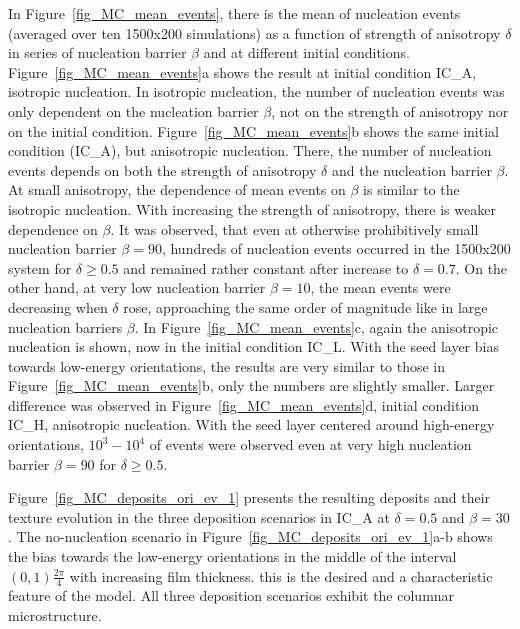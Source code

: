 In Figure~\ref{fig_MC_mean_events}, there is the mean of nucleation events (averaged over ten 1500x200 simulations) as a function of strength of anisotropy $\delta$ in series of nucleation barrier $\beta$ and at different initial conditions. Figure~\ref{fig_MC_mean_events}a shows the result at initial condition IC\_A, isotropic nucleation. In isotropic nucleation, the number of nucleation events was only dependent on the nucleation barrier $\beta$, not on the strength of anisotropy nor on the initial condition. Figure~\ref{fig_MC_mean_events}b shows the same initial condition (IC\_A), but anisotropic nucleation. There, the number of nucleation events depends on both the strength of anisotropy $\delta$ and the nucleation barrier $\beta$. At small anisotropy, the dependence of mean events on $\beta$ is similar to the isotropic nucleation. With increasing the strength of anisotropy, there is weaker dependence on $\beta$. It was observed, that even at otherwise prohibitively small nucleation barrier $\beta=90$, hundreds of nucleation events occurred in the 1500x200 system for $\delta\geq 0.5$ and remained rather constant after increase to $\delta=0.7$. On the other hand, at very low nucleation barrier $\beta=10$, the mean events were decreasing when $\delta$ rose, approaching the same order of magnitude like in large nucleation barriers $\beta$. In Figure~\ref{fig_MC_mean_events}c, again the anisotropic nucleation is shown, now in the initial condition IC\_L. With the seed layer bias towards low-energy orientations, the results are very similar to those in Figure~\ref{fig_MC_mean_events}b, only the numbers are slightly smaller. Larger difference was observed in Figure~\ref{fig_MC_mean_events}d, initial condition IC\_H, anisotropic nucleation. With the seed layer centered around high-energy orientations, $10^3-10^4$ of events were observed even at very high nucleation barrier $\beta=90$ for $\delta \geq 0.5$.

Figure~\ref{fig_MC_deposits_ori_ev_1} presents the resulting deposits and their texture evolution in the three deposition scenarios in IC\_A at $\delta=0.5$ and $\beta=30$. The no-nucleation scenario in Figure~\ref{fig_MC_deposits_ori_ev_1}a-b shows the bias towards the low-energy orientations in the middle of the interval $(0,1)\frac{2\pi}{4}$ with increasing film thickness. this is the desired and a characteristic feature of the model. All three deposition scenarios exhibit the columnar microstructure.

